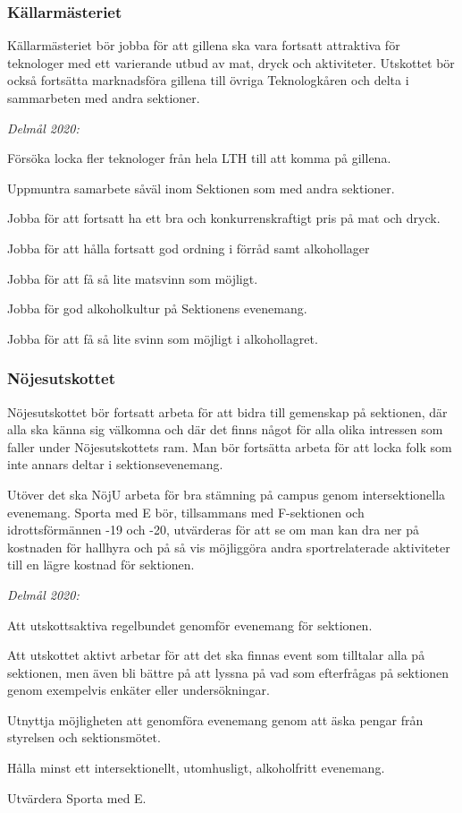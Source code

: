 \documentclass[../_main/handlingar.tex]{subfiles}
\begin{document}
\subsubsection*{Källarmästeriet}
Källarmästeriet bör jobba för att gillena ska vara fortsatt attraktiva för teknologer med ett varierande utbud av mat, dryck och aktiviteter. Utskottet bör också fortsätta marknadsföra gillena till övriga Teknologkåren och delta i sammarbeten med andra sektioner.

\emph{Delmål 2020:}
\begin{dashlist}
	\item Försöka locka fler teknologer från hela LTH till att komma på gillena.
	\item Uppmuntra samarbete såväl inom Sektionen som med andra sektioner.
	\item Jobba för att fortsatt ha ett bra och konkurrenskraftigt pris på mat och dryck.
	\item Jobba för att hålla fortsatt god ordning i förråd samt alkohollager
	\item Jobba för att få så lite matsvinn som möjligt.
	\item Jobba för god alkoholkultur på Sektionens evenemang.
	\item Jobba för att få så lite svinn som möjligt i alkohollagret.
\end{dashlist}
\newpage
\subsubsection*{Nöjesutskottet}
Nöjesutskottet bör fortsatt arbeta för att bidra till gemenskap på sektionen, där alla ska känna sig välkomna och där det finns något för alla olika intressen som faller under Nöjesutskottets ram. Man bör fortsätta arbeta för att locka folk som inte annars deltar i sektionsevenemang. 

Utöver det ska NöjU arbeta för bra stämning på campus genom intersektionella evenemang. Sporta med E bör, tillsammans med F-sektionen och idrottsförmännen -19 och -20, utvärderas för att se om man kan dra ner på kostnaden för hallhyra och på så vis möjliggöra andra sportrelaterade aktiviteter till en lägre kostnad för sektionen.  


\emph{Delmål 2020:}
\begin{dashlist}
	\item Att utskottsaktiva regelbundet genomför evenemang för sektionen.
	\item Att utskottet aktivt arbetar för att det ska finnas event som tilltalar alla på sektionen, men även bli bättre på att lyssna på vad som efterfrågas på sektionen genom exempelvis enkäter eller undersökningar.
	\item Utnyttja möjligheten att genomföra evenemang genom att äska pengar från styrelsen och sektionsmötet.
	\item Hålla minst ett intersektionellt, utomhusligt, alkoholfritt evenemang.
	\item Utvärdera Sporta med E.
\end{dashlist}
\end{document}
